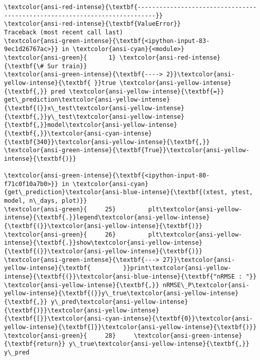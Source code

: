\documentclass[11pt]{article}
\begin{document}
    \begin{Verbatim}[commandchars=\\\{\}, frame=single, framerule=2mm, rulecolor=\color{outerrorbackground}]
\textcolor{ansi-red-intense}{\textbf{---------------------------------------------------------------------------}}
\textcolor{ansi-red-intense}{\textbf{ValueError}}                                Traceback (most recent call last)
\textcolor{ansi-green-intense}{\textbf{<ipython-input-83-9ec1d26767ac>}} in \textcolor{ansi-cyan}{<module>}
\textcolor{ansi-green}{      1} \textcolor{ansi-red-intense}{\textbf{\# Sur train}}
\textcolor{ansi-green-intense}{\textbf{----> 2}}\textcolor{ansi-yellow-intense}{\textbf{ }}true \textcolor{ansi-yellow-intense}{\textbf{,}} pred \textcolor{ansi-yellow-intense}{\textbf{=}} get\_prediction\textcolor{ansi-yellow-intense}{\textbf{(}}x\_test\textcolor{ansi-yellow-intense}{\textbf{,}}y\_test\textcolor{ansi-yellow-intense}{\textbf{,}}model\textcolor{ansi-yellow-intense}{\textbf{,}}\textcolor{ansi-cyan-intense}{\textbf{340}}\textcolor{ansi-yellow-intense}{\textbf{,}} \textcolor{ansi-green-intense}{\textbf{True}}\textcolor{ansi-yellow-intense}{\textbf{)}}

\textcolor{ansi-green-intense}{\textbf{<ipython-input-80-f71c0f10a7b0>}} in \textcolor{ansi-cyan}{get\_prediction}\textcolor{ansi-blue-intense}{\textbf{(xtest, ytest, model, n\_days, plot)}}
\textcolor{ansi-green}{     25}         plt\textcolor{ansi-yellow-intense}{\textbf{.}}legend\textcolor{ansi-yellow-intense}{\textbf{(}}\textcolor{ansi-yellow-intense}{\textbf{)}}
\textcolor{ansi-green}{     26}         plt\textcolor{ansi-yellow-intense}{\textbf{.}}show\textcolor{ansi-yellow-intense}{\textbf{(}}\textcolor{ansi-yellow-intense}{\textbf{)}}
\textcolor{ansi-green-intense}{\textbf{---> 27}}\textcolor{ansi-yellow-intense}{\textbf{         }}print\textcolor{ansi-yellow-intense}{\textbf{(}}\textcolor{ansi-blue-intense}{\textbf{"nRMSE : "}} \textcolor{ansi-yellow-intense}{\textbf{,}} nRMSE\_P\textcolor{ansi-yellow-intense}{\textbf{(}}y\_true\textcolor{ansi-yellow-intense}{\textbf{,}} y\_pred\textcolor{ansi-yellow-intense}{\textbf{)}}\textcolor{ansi-yellow-intense}{\textbf{[}}\textcolor{ansi-cyan-intense}{\textbf{0}}\textcolor{ansi-yellow-intense}{\textbf{]}}\textcolor{ansi-yellow-intense}{\textbf{)}}
\textcolor{ansi-green}{     28}     \textcolor{ansi-green-intense}{\textbf{return}} y\_true\textcolor{ansi-yellow-intense}{\textbf{,}} y\_pred


\end{Verbatim}
\end{document}
